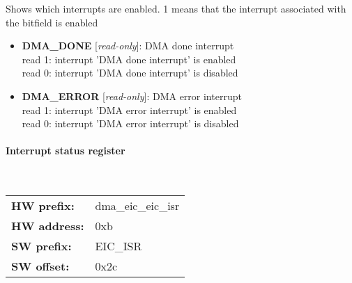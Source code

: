 \vspace{12pt}
Shows which interrupts are enabled. 1 means that the interrupt associated with the bitfield is enabled

\vspace{12pt}
\noindent
{}

\begin{itemize}
\item \begin{small}
{\bf 
DMA\_DONE
} [\emph{read-only}]: DMA done interrupt
\\
read 1: interrupt 'DMA done interrupt' is enabled\\read 0: interrupt 'DMA done interrupt' is disabled
\end{small}
\item \begin{small}
{\bf 
DMA\_ERROR
} [\emph{read-only}]: DMA error interrupt
\\
read 1: interrupt 'DMA error interrupt' is enabled\\read 0: interrupt 'DMA error interrupt' is disabled
\end{small}
\end{itemize}
\paragraph*{Interrupt status register}\mbox{}\\\vskip 6pt
\begin{tabular}{l l }
{\bf HW prefix:}  & dma\_eic\_eic\_isr\\
{\bf HW address:}  & 0xb\\
{\bf SW prefix:}  & EIC\_ISR\\
{\bf SW offset:}  & 0x2c\\
\end{tabular}

